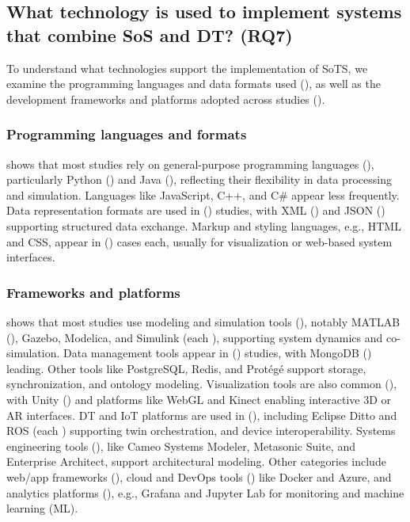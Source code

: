 \subsection{What technology is used to implement systems that combine SoS and DT? (RQ7)}\label{results-rq7}

To understand what technologies support the implementation of SoTS, we examine the programming languages and data formats used (), as well as the development frameworks and platforms adopted across studies ().



\subsubsection{Programming languages and formats}\label{sec:programming-languages}

 shows that most studies rely on general-purpose programming languages (), particularly Python () and Java (), reflecting their flexibility in data processing and simulation. Languages like JavaScript, C++, and C\# appear less frequently.
Data representation formats are used in () studies, with XML () and JSON () supporting structured data exchange.
Markup and styling languages, e.g., HTML and CSS, appear in () cases each, usually for visualization or web-based system interfaces.



\subsubsection{Frameworks and platforms}\label{sec:frameworks}


 shows that most studies use modeling and simulation tools (), notably MATLAB (), Gazebo, Modelica, and Simulink (each ), supporting system dynamics and co-simulation.
Data management tools appear in () studies, with MongoDB () leading. Other tools like PostgreSQL, Redis, and Protégé support storage, synchronization, and ontology modeling.
Visualization tools are also common (), with Unity () and platforms like WebGL and Kinect enabling interactive 3D or AR interfaces.
DT and IoT platforms are used in (), including Eclipse Ditto and ROS (each ) supporting twin orchestration, and device interoperability.
Systems engineering tools (), like Cameo Systems Modeler, Metasonic Suite, and Enterprise Architect, support architectural modeling.
Other categories include web/app frameworks (), cloud and DevOps tools () like Docker and Azure, and analytics platforms (), e.g., Grafana and Jupyter Lab for monitoring and machine learning (ML).

